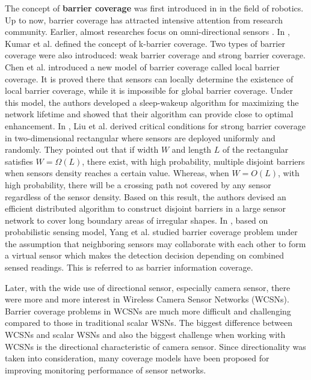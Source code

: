 The concept of \textcolor{ProcessBlue}{\bfseries barrier coverage} was first introduced in \cite{gage1992command} in the field of robotics. 
Up to now, barrier coverage has attracted intensive attention from research community. Earlier, almost researches focus on omni-directional sensors \cite{chen2007designing, kumar2005barrier, liu2008strong, yang2009barrier}. In \cite{kumar2005barrier}, Kumar et al. defined the concept of k-barrier coverage. Two types of barrier coverage were also introduced: weak barrier coverage and strong barrier coverage. Chen et al. \cite{chen2007designing} introduced a new model of barrier coverage called local barrier coverage. It is proved there that sensors can locally determine the existence of local barrier coverage, while it is impossible for global barrier coverage. Under this model, the authors developed a sleep-wakeup algorithm for maximizing the network lifetime and showed that their algorithm can provide close to optimal enhancement. In \cite{liu2008strong}, Liu et al. derived critical conditions for strong barrier coverage in two-dimensional rectangular where sensors are deployed uniformly and randomly. They pointed out that if width $W$ and length $L$ of the rectangular satisfies $W=\Omega(L)$, there exist, with high probability, multiple disjoint barriers when sensors density reaches a certain value. Whereas, when $W=O(L)$, with high probability, there will be a crossing path not covered by any sensor regardless of the sensor density. Based on this result, the authors devised an efficient distributed algorithm to construct disjoint barriers in a large sensor network to cover long boundary areas of irregular shapes. In \cite{yang2009barrier}, based on probabilistic sensing model, Yang et al. studied barrier coverage problem under the assumption that neighboring sensors may collaborate with each other to form a virtual sensor which makes the detection decision depending on combined sensed readings. This is referred to as barrier information coverage.\par
Later, with the wide use of directional sensor, especially camera sensor, there were more and more interest in Wireless Camera Sensor Networks (WCSNs). Barrier coverage problems in WCSNs are much more difficult and challenging compared to those in traditional scalar WSNs. The biggest difference between WCSNs and scalar WSNs and also the biggest challenge when working with WCSNs is the directional characteristic of camera sensor. Since directionality was taken into consideration, many coverage models have been proposed for improving monitoring performance of sensor networks. \par
